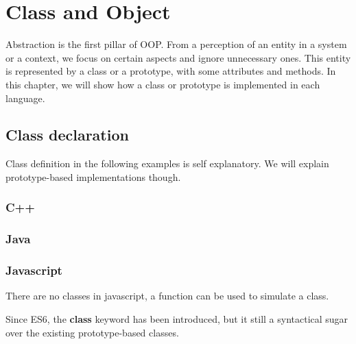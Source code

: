 \documentclass{KodeBook}
\begin{document}
	\chapter{Class and Object}
\fi

\begin{introduction}
	Abstraction is the first pillar of OOP. 
	From a perception of an entity in a system or a context, we focus on certain aspects and ignore unnecessary ones.
	This entity is represented by a class or a prototype, with some attributes and methods.
	In this chapter, we will show how a class  or prototype  is implemented in each language.
\end{introduction}

\section{Class declaration}

Class definition in the following examples is self explanatory. 
We will explain prototype-based implementations though.

\subsection{C++}



\subsection{Java}



\subsection{Javascript}

There are no classes in javascript, a function can be used to simulate a class. 



Since ES6, the \textbf{class} keyword has been introduced, but it still a syntactical sugar over the existing prototype-based classes.


\end{document}
